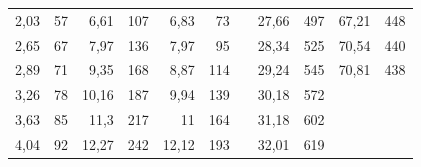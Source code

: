 \documentclass[a4paper,12pt]{article} %
\begin{document}
\begin{table}[]
\begin{tabular}{|rr|rr|rr|lrrll}
\multicolumn{1}{|r|}{2,03}          & 57                                   & \multicolumn{1}{r|}{6,61}          & 107                                  & \multicolumn{1}{r|}{6,83}          & 73                                   & \multicolumn{1}{l|}{} & \multicolumn{1}{r|}{27,66}         & \multicolumn{1}{r|}{497}             & \multicolumn{1}{r|}{67,21}         & \multicolumn{1}{r|}{448}             \\ \cline{1-6} \cline{8-11} 
\multicolumn{1}{|r|}{2,65}          & 67                                   & \multicolumn{1}{r|}{7,97}          & 136                                  & \multicolumn{1}{r|}{7,97}          & 95                                   & \multicolumn{1}{l|}{} & \multicolumn{1}{r|}{28,34}         & \multicolumn{1}{r|}{525}             & \multicolumn{1}{r|}{70,54}         & \multicolumn{1}{r|}{440}             \\ \cline{1-6} \cline{8-11} 
\multicolumn{1}{|r|}{2,89}          & 71                                   & \multicolumn{1}{r|}{9,35}          & 168                                  & \multicolumn{1}{r|}{8,87}          & 114                                  & \multicolumn{1}{l|}{} & \multicolumn{1}{r|}{29,24}         & \multicolumn{1}{r|}{545}             & \multicolumn{1}{r|}{70,81}         & \multicolumn{1}{r|}{438}             \\ \cline{1-6} \cline{8-11} 
\multicolumn{1}{|r|}{3,26}          & 78                                   & \multicolumn{1}{r|}{10,16}         & 187                                  & \multicolumn{1}{r|}{9,94}          & 139                                  & \multicolumn{1}{l|}{} & \multicolumn{1}{r|}{30,18}         & \multicolumn{1}{r|}{572}             &                                    &                                      \\ \cline{1-6} \cline{8-9}
\multicolumn{1}{|r|}{3,63}          & 85                                   & \multicolumn{1}{r|}{11,3}          & 217                                  & \multicolumn{1}{r|}{11}            & 164                                  & \multicolumn{1}{l|}{} & \multicolumn{1}{r|}{31,18}         & \multicolumn{1}{r|}{602}             &                                    &                                      \\ \cline{1-6} \cline{8-9}
\multicolumn{1}{|r|}{4,04}          & 92                                   & \multicolumn{1}{r|}{12,27}         & 242                                  & \multicolumn{1}{r|}{12,12}         & 193                                  & \multicolumn{1}{l|}{} & \multicolumn{1}{r|}{32,01}         & \multicolumn{1}{r|}{619}             &                                    &                                      \\ \cline{1-6} \cline{8-9}

\end{tabular}
\end{table}
\end{document}
